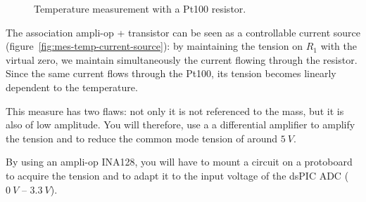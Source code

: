 \documentclass[11pt,a4paper]{article}
\theoremstyle{definition}%
\begin{document}
\begin{figure}[H]
\center
\caption{Temperature measurement with a Pt100 resistor.}
\label{fig:mes-temp}
\end{figure}

The association ampli-op + transistor  can be seen as a controllable current source (figure~\ref{fig:mes-temp-current-source}): by maintaining the tension on $R_1$ with the virtual zero, we maintain simultaneously the current flowing through the resistor.
Since the same current flows through the Pt100, its tension becomes linearly dependent to the temperature.

This measure has two flaws: not only it is not referenced to the mass, but it is also of low amplitude.
You will therefore, use a a differential amplifier to amplify the tension and to reduce the common mode tension of around $5~V$.

By using an ampli-op INA128, you will have to mount a circuit on a protoboard to acquire the tension and to adapt it to the input voltage of the dsPIC ADC ($0~V$ -- $3.3~V$).
\end{document}
